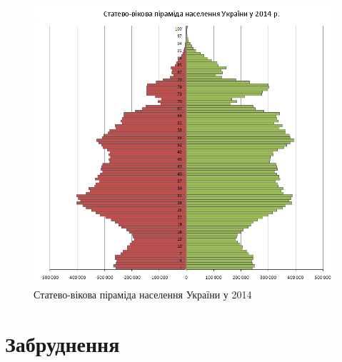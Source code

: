             \begin{figure}[!htp]
                \centering
                \includegraphics[scale = 0.4]{PNG/PopulationPyramideUkraine2013.PNG}
                \caption{Статево-вікова піраміда населення України у 2014}
                \label{fig:age14}
            \end{figure}

        \section{Забруднення}